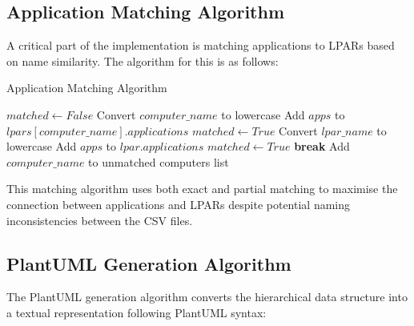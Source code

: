\documentclass[a4paper,12pt]{article}
\begin{document}
\subsection{Application Matching Algorithm}

A critical part of the implementation is matching applications to LPARs based on name similarity. The algorithm for this is as follows:

\begin{algorithm}
\caption{Application Matching Algorithm}
\begin{algorithmic}[1]
        \State $matched \gets False$
        \State Convert $computer\_name$ to lowercase
            \State Add $apps$ to $lpars[computer\_name].applications$
            \State $matched \gets True$
        \Else
                \State Convert $lpar\_name$ to lowercase
                    \State Add $apps$ to $lpar.applications$
                    \State $matched \gets True$
                    \State \textbf{break}
                \EndIf
            \EndFor
        \EndIf
            \State Add $computer\_name$ to unmatched computers list
        \EndIf
    \EndFor
\EndProcedure
\end{algorithmic}
\end{algorithm}

This matching algorithm uses both exact and partial matching to maximise the connection between applications and LPARs despite potential naming inconsistencies between the CSV files.

\subsection{PlantUML Generation Algorithm}

The PlantUML generation algorithm converts the hierarchical data structure into a textual representation following PlantUML syntax:
\end{document}
